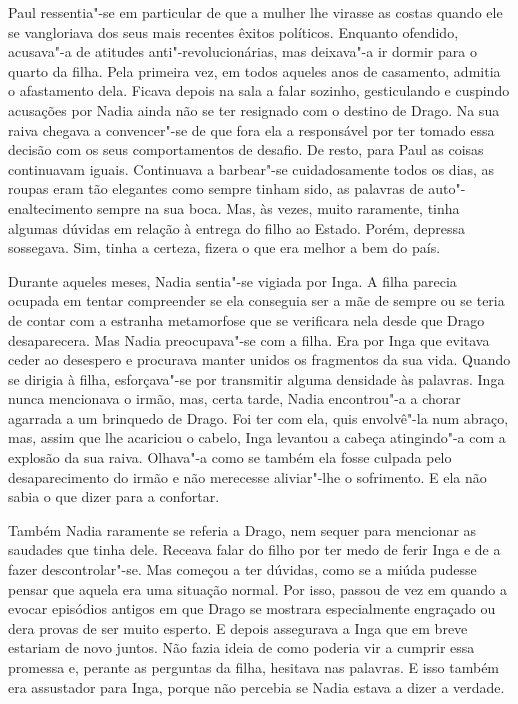 Paul ressentia"-se em particular de que a mulher lhe virasse as costas
quando ele se vangloriava dos seus mais recentes êxitos políticos.
Enquanto ofendido, acusava"-a de atitudes anti"-revolucionárias, mas
deixava"-a ir dormir para o quarto da filha. Pela primeira vez, em todos
aqueles anos de casamento, admitia o afastamento dela. Ficava depois na
sala a falar sozinho, gesticulando e cuspindo acusações por Nadia ainda
não se ter resignado com o destino de Drago. Na sua raiva chegava a
convencer"-se de que fora ela a responsável por ter tomado essa decisão
com os seus comportamentos de desafio. De resto, para Paul as coisas
continuavam iguais. Continuava a barbear"-se cuidadosamente todos os
dias, as roupas eram tão elegantes como sempre tinham sido, as palavras
de auto"-enaltecimento sempre na sua boca. Mas, às vezes, muito
raramente, tinha algumas dúvidas em relação à entrega do filho ao
Estado. Porém, depressa sossegava. Sim, tinha a certeza, fizera o que
era melhor a bem do país.

Durante aqueles meses, Nadia sentia"-se vigiada por Inga. A filha parecia
ocupada em tentar compreender se ela conseguia ser a mãe de sempre ou se
teria de contar com a estranha metamorfose que se verificara nela desde
que Drago desaparecera. Mas Nadia preocupava"-se com a filha. Era por
Inga que evitava ceder ao desespero e procurava manter unidos os
fragmentos da sua vida. Quando se dirigia à filha, esforçava"-se por
transmitir alguma densidade às palavras. Inga nunca mencionava o
irmão, mas, certa tarde, Nadia encontrou"-a a chorar agarrada a um
brinquedo de Drago. Foi ter com ela, quis envolvê"-la num abraço, mas,
assim que lhe acariciou o cabelo, Inga levantou a cabeça atingindo"-a
com a explosão da sua raiva. Olhava"-a como se também ela fosse culpada
pelo desaparecimento do irmão e não merecesse aliviar"-lhe o sofrimento. E ela não sabia o que dizer para a confortar.

Também Nadia raramente se referia a Drago, nem
sequer para mencionar as saudades que tinha dele. Receava falar do filho
por ter medo de ferir Inga e de a fazer descontrolar"-se. Mas começou a
ter dúvidas, como se a miúda pudesse pensar que aquela era uma situação
normal. Por isso, passou de vez em quando a evocar episódios
antigos em que Drago se mostrara especialmente engraçado ou dera
provas de ser muito esperto. E depois assegurava a Inga que em breve
estariam de novo juntos. Não fazia ideia de como poderia vir a cumprir
essa promessa e, perante as perguntas da filha, hesitava nas palavras. E
isso também era assustador para Inga, porque não percebia se Nadia
estava a dizer a verdade.


